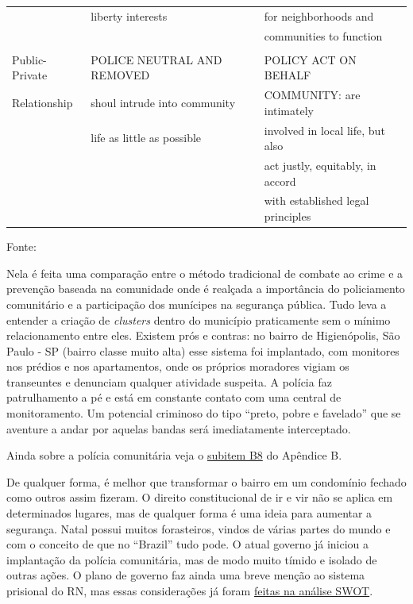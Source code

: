 \documentclass[
	12pt,				%
	openright,			%
	twoside,			%
	a4paper,			%
	chapter=TITLE,		%
	section=TITLE,		%
	subsection=TITLE,	%
	subsubsection=TITLE,%
	spanish,            %
	english,			%
	brazil				%
	]{abntex2}
\begin{document}
\begin{table}[!htpb]
\begin{tiny}
\begin{center}
\begin{tabular}{lll}
			& liberty interests & for neighborhoods and \\
			& & communities to function \\\\
			Public-Private & POLICE NEUTRAL AND REMOVED & POLICY ACT ON BEHALF \\
			Relationship & shoul intrude  into community & COMMUNITY: are intimately\\
			& life as little as possible & involved in local life, but also\\
			& & act justly, equitably, in accord\\
			& & with established legal principles\\
			\hline
		\end{tabular}%
		\end{center}
	\end{tiny}
	\ABNTEXchapterfont\small{Fonte: \cite[p. ~240-241]{Kelling}}
\end{table}

\par
Nela é feita uma comparação entre o método tradicional de combate ao crime e a prevenção baseada na comunidade onde é realçada a importância do policiamento comunitário e a participação dos munícipes na segurança pública. Tudo leva a entender a criação de \textit{clusters} dentro do município praticamente sem o mínimo relacionamento entre eles. Existem prós e contras: no bairro de Higienópolis, São Paulo - SP (bairro classe muito alta) esse sistema foi implantado, com monitores nos prédios e nos apartamentos, onde os próprios moradores vigiam os transeuntes e denunciam qualquer atividade suspeita. A polícia faz patrulhamento a pé e está em constante contato com uma central de monitoramento. Um potencial criminoso do tipo “preto, pobre e favelado” que se aventure a andar por aquelas bandas será imediatamente interceptado.
\hypertarget{CA1}{}
\par
Ainda sobre a polícia comunitária veja o \hyperlink{B8}{subitem B8} do Apêndice B.
\par
De qualquer forma, é melhor que transformar o bairro em um condomínio fechado como outros assim fizeram. O direito constitucional de ir e vir não se aplica em determinados lugares, mas de qualquer forma é uma ideia para aumentar a segurança. Natal possui muitos forasteiros, vindos de várias partes do mundo e com o conceito de que no “Brazil” tudo pode. O atual governo já iniciou a implantação da polícia comunitária, mas de modo muito tímido e isolado de outras ações.  O plano de governo faz ainda uma breve menção ao sistema prisional do RN, mas essas considerações já foram \hyperlink{W9}{feitas na análise SWOT}.
\end{document}
